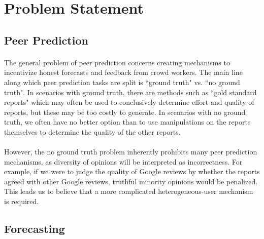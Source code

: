 \documentclass[a4paper, 11pt]{article}
\begin{document}
\maketitle


\section{Problem Statement}
\subsection{Peer Prediction} 
\paragraph{}The general problem of peer prediction concerns creating mechanisms to incentivize honest forecasts and feedback from crowd workers. The main line along which peer prediction tasks are split is ``ground truth" vs. ``no ground truth". In scenarios with ground truth, there are methods such as ``gold standard reports" which may often be used to conclusively determine effort and quality of reports, but these may be too costly to generate. In scenarios with no ground truth, we often have no better option than to use manipulations on the reports themselves to determine the quality of the other reports. 
\paragraph{}However, the no ground truth problem inherently prohibits many peer prediction mechanisms, as diversity of opinions will be interpreted as incorrectness. For example, if we were to judge the quality of Google reviews by whether the reports agreed with other Google reviews, truthful minority opinions would be penalized. This leads us to believe that a more complicated heterogeneous-user mechanism is required.
\subsection{Forecasting} 
\end{document}
